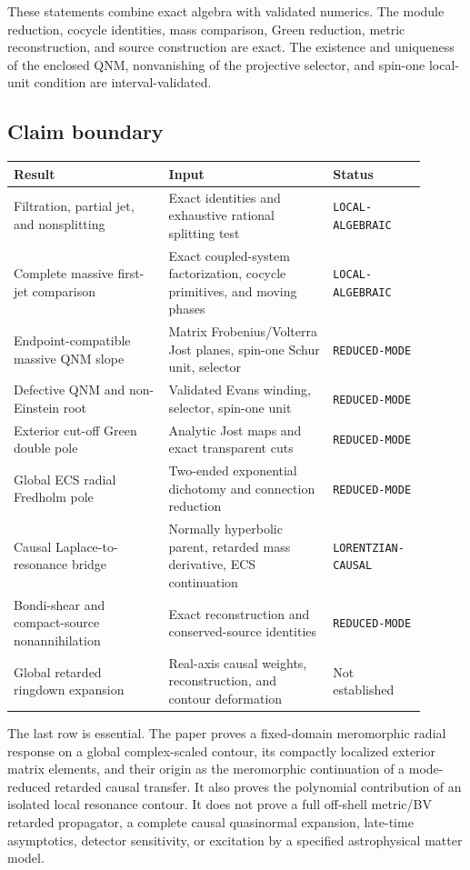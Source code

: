 \documentclass[11pt]{article}
\theoremstyle{remark}
\begin{document}
These statements combine exact algebra with validated numerics.  The
module reduction, cocycle identities, mass comparison, Green reduction,
metric reconstruction, and source construction are exact.  The existence
and uniqueness of the enclosed QNM, nonvanishing of the projective
selector, and spin-one local-unit condition are interval-validated.

\subsection*{Claim boundary}

\begin{center}
\footnotesize
\begin{tabular}{p{0.34\linewidth}p{0.36\linewidth}p{0.20\linewidth}}
\toprule
Result & Input & Status\\
\midrule
Filtration, partial jet, and nonsplitting
& Exact identities and exhaustive rational splitting test
& \texttt{LOCAL-ALGEBRAIC}\\
Complete massive first-jet comparison
& Exact coupled-system factorization, cocycle primitives, and moving phases
& \texttt{LOCAL-ALGEBRAIC}\\
Endpoint-compatible massive QNM slope
& Matrix Frobenius/Volterra Jost planes, spin-one Schur unit, selector
& \texttt{REDUCED-MODE}\\
Defective QNM and non-Einstein root
& Validated Evans winding, selector, spin-one unit
& \texttt{REDUCED-MODE}\\
Exterior cut-off Green double pole
& Analytic Jost maps and exact transparent cuts
& \texttt{REDUCED-MODE}\\
Global ECS radial Fredholm pole
& Two-ended exponential dichotomy and connection reduction
& \texttt{REDUCED-MODE}\\
Causal Laplace-to-resonance bridge
& Normally hyperbolic parent, retarded mass derivative, ECS continuation
& \texttt{LORENTZIAN-CAUSAL}\\
Bondi-shear and compact-source nonannihilation
& Exact reconstruction and conserved-source identities
& \texttt{REDUCED-MODE}\\
Global retarded ringdown expansion
& Real-axis causal weights, reconstruction, and contour deformation
& Not established\\
\bottomrule
\end{tabular}
\end{center}

The last row is essential.  The paper proves a fixed-domain meromorphic
radial response on a global complex-scaled contour, its compactly
localized exterior matrix elements, and their origin as the meromorphic
continuation of a mode-reduced retarded causal transfer.  It also proves
the polynomial contribution of an isolated local resonance contour.  It
does not prove a full off-shell metric/BV retarded propagator, a complete
causal quasinormal expansion, late-time
asymptotics, detector sensitivity, or excitation by a specified
astrophysical matter model.
\end{document}
